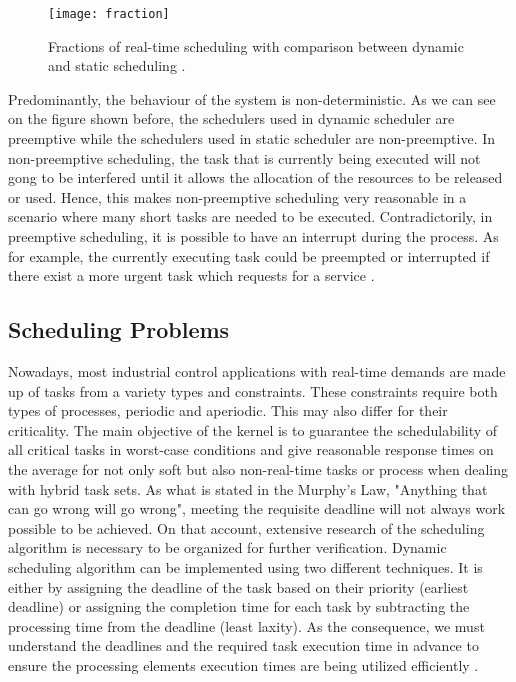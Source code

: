 \begin{figure}[htp]
    \centering
    \texttt{[image: fraction]}
    \caption{Fractions of real-time scheduling with comparison between dynamic and static scheduling \cite{b3}.}
    \label{fraction}
\end{figure}

Predominantly, the behaviour of the system is non-deterministic. As we can see on the figure shown before, the schedulers used in dynamic scheduler are preemptive while the schedulers used in static scheduler are non-preemptive. In non-preemptive scheduling, the task that is currently being executed will not gong to be interfered until it allows the allocation of the resources to be released or used. Hence, this makes non-preemptive scheduling very reasonable in a scenario where many short tasks are needed to be executed. Contradictorily, in preemptive scheduling, it is possible to have an interrupt during the process. As for example, the currently executing task could be preempted or interrupted if there exist a more urgent task which requests for a service \cite{b3}.

\subsection{Scheduling Problems}

Nowadays, most industrial control applications with real-time demands are made up of tasks from a variety types and constraints. These constraints require both types of processes, periodic and aperiodic. This may also differ for their criticality. The main objective of the kernel is to guarantee the schedulability of all critical tasks in worst-case conditions and give reasonable response times on the average for not only soft but also non-real-time tasks or process when dealing with hybrid task sets. 
As what is stated in the Murphy’s Law, "Anything that can go wrong will go wrong", meeting the requisite deadline will not always work possible to be achieved. On that account, extensive research of the scheduling algorithm is necessary to be organized for further verification. Dynamic scheduling algorithm can be implemented using two different techniques. It is either by assigning the deadline of the task based on their priority (earliest deadline) or assigning the completion time for each task by subtracting the processing time from the deadline (least laxity). As the consequence, we must understand the deadlines and the required task execution time in advance to ensure the processing elements execution times are being utilized efficiently \cite{b9}.


